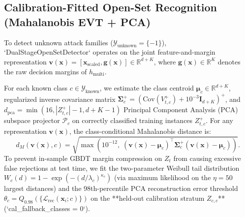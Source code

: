 ﻿\documentclass[conference]{IEEEtran}
\begin{document}
\subsection{Calibration-Fitted Open-Set Recognition (Mahalanobis EVT + PCA)}
To detect unknown attack families ($\mathcal{Y}_{\text{unknown}} = \{-1\}$), `DualStageOpenSetDetector` operates on the joint feature-and-margin representation $\mathbf{v}(\mathbf{x}) = [\mathbf{x}_{\text{scaled}}, \mathbf{g}(\mathbf{x})] \in \mathbb{R}^{d+K}$, where $\mathbf{g}(\mathbf{x}) \in \mathbb{R}^K$ denotes the raw decision margins of $h_{\text{multi}}$.

For each known class $c \in \mathcal{Y}_{\text{known}}$, we estimate the class centroid $\boldsymbol{\mu}_c \in \mathbb{R}^{d+K}$, regularized inverse covariance matrix $\boldsymbol{\Sigma}_c^{+} = (\text{Cov}(V_{t,c}^{+}) + 10^{-3}\mathbf{I}_{d+K})^{+}$, and $d_{\text{pca}} = \min(16, |Z_{t,c}^{+}|-1, d+K-1)$ Principal Component Analysis (PCA) subspace projector $\mathcal{P}_c$ on correctly classified training instances $Z_{t,c}^{+}$. For any representation $\mathbf{v}(\mathbf{x})$, the class-conditional Mahalanobis distance is:
\begin{equation}
d_M(\mathbf{v}(\mathbf{x}), c) = \sqrt{\max\left(10^{-12}, \; (\mathbf{v}(\mathbf{x}) - \boldsymbol{\mu}_c)^\top \boldsymbol{\Sigma}_c^{+} (\mathbf{v}(\mathbf{x}) - \boldsymbol{\mu}_c)\right)}.
\label{eq:maha}
\end{equation}
To prevent in-sample GBDT margin compression on $Z_t$ from causing excessive false rejections at test time, we fit the two-parameter Weibull tail distribution $W_c(d) = 1 - \exp(-(d/\lambda_c)^{\kappa_c})$ (via maximum likelihood on the $\eta = 50$ largest distances) and the 98th-percentile PCA reconstruction error threshold $\theta_c = Q_{0.98}(\{\mathcal{L}_{\text{rec}}(\mathbf{x}_i; c)\})$ on the **held-out calibration stratum $Z_{c,c}$** (`cal_fallback_classes = 0`).
\end{document}
